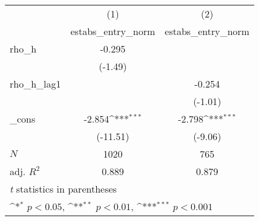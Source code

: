 {
\def\sym#1{\ifmmode^{#1}\else\(^{#1}\)\fi}
\begin{tabular}{l*{2}{c}}
\toprule
            &\multicolumn{1}{c}{(1)}&\multicolumn{1}{c}{(2)}\\
            &\multicolumn{1}{c}{estabs\_entry\_norm}&\multicolumn{1}{c}{estabs\_entry\_norm}\\
\midrule
rho\_h       &      -0.295         &                     \\
            &     (-1.49)         &                     \\
\addlinespace
rho\_h\_lag1  &                     &      -0.254         \\
            &                     &     (-1.01)         \\
\addlinespace
\_cons      &      -2.854\sym{***}&      -2.798\sym{***}\\
            &    (-11.51)         &     (-9.06)         \\
\midrule
\(N\)       &        1020         &         765         \\
adj. \(R^{2}\)&       0.889         &       0.879         \\
\bottomrule
\multicolumn{3}{l}{\footnotesize \textit{t} statistics in parentheses}\\
\multicolumn{3}{l}{\footnotesize \sym{*} \(p<0.05\), \sym{**} \(p<0.01\), \sym{***} \(p<0.001\)}\\
\end{tabular}
}

